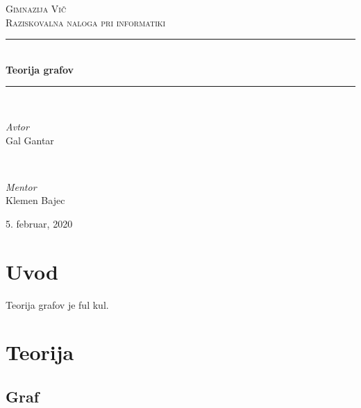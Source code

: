 \documentclass[11pt]{article}
\begin{document}
\begin{titlepage}
	\newcommand{\HRule}{\rule{\linewidth}{0.5mm}} %
	
	\center %
	
	\textsc{\LARGE Gimnazija Vič}\\[1.5cm] %
	
	\textsc{\Large Raziskovalna naloga pri informatiki}\\[0.5cm] %
	
	\HRule\\[0.4cm]
	
	{\huge\bfseries Teorija grafov}\\[0.4cm] %
	
	\HRule\\[1.5cm]
	
	\begin{minipage}{0.4\textwidth}
		\begin{flushleft}
			\large
			\textit{Avtor}\\
			Gal Gantar
		\end{flushleft}
	\end{minipage}
	~
	\begin{minipage}{0.4\textwidth}
		\begin{flushright}
			\large
			\textit{Mentor}\\
			Klemen Bajec
		\end{flushright}
	\end{minipage}
	
	\vfill\vfill\vfill
	
	{\large 5. februar, 2020}
	
\end{titlepage}


\tableofcontents %
\newpage

\section{Uvod}

Teorija grafov je ful kul.

\section{Teorija}


\subsection{Graf}
\end{document}
